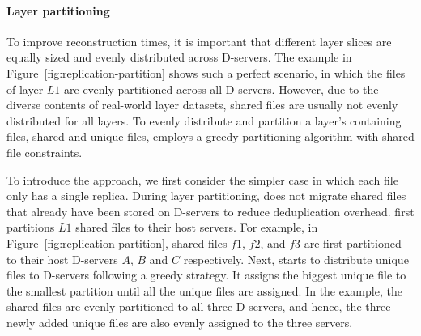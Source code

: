 %
\paragraph{Layer partitioning}
To improve reconstruction times, it is important that different layer slices
are equally sized and evenly distributed across D-servers.
The example in Figure~\ref{fig:replication-partition}
shows such a perfect scenario, in which the files of layer $L1$ are evenly partitioned across all D-servers.
However, due to the diverse contents of real-world layer datasets,
shared files are usually not evenly distributed for all layers.
To evenly distribute and partition a layer's containing files, shared and unique files,
%
\sysname employs a greedy partitioning algorithm with shared file constraints.

To introduce the approach, we first consider the simpler case in which each file only has
a single replica. During layer partitioning, \sysname does not migrate shared files that already
have been stored on D-servers to reduce deduplication overhead.
%
%
\sysname first partitions $L1$ shared files to their host servers.
For example, in Figure~\ref{fig:replication-partition},
shared files $f1$, $f2$, and $f3$ are first partitioned to their host D-servers $A$, $B$ and $C$
respectively. Next, \sysname starts to distribute unique files to D-servers following a greedy strategy.
It assigns the biggest unique file to the smallest partition until all the unique files are assigned.
In the example, the shared files are evenly partitioned to all three D-servers,
and hence, the three newly added unique files are also evenly assigned to the three servers.

